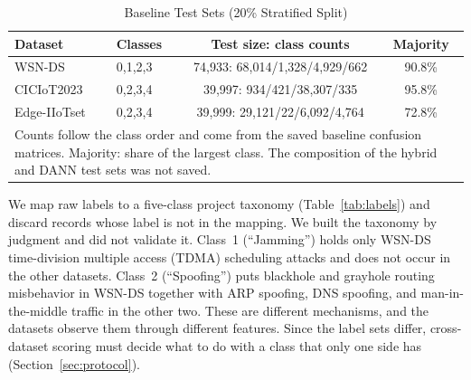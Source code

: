 \documentclass[conference]{IEEEtran}
\begin{document}
\begin{table}[t]
\caption{Baseline Test Sets (20\% Stratified Split)}
\label{tab:datasets}
\centering
\footnotesize
\setlength{\tabcolsep}{5pt}
\begin{tabular}{|l|l|c|c|}
\hline
\textbf{Dataset} & \textbf{Classes} & \textbf{Test size: class counts} & \textbf{Majority} \\
\hline
WSN-DS & 0,1,2,3 & 74{,}933: 68{,}014/1{,}328/4{,}929/662 & 90.8\% \\
\hline
CICIoT2023 & 0,2,3,4 & 39{,}997: 934/421/38{,}307/335 & 95.8\% \\
\hline
Edge-IIoTset & 0,2,3,4 & 39{,}999: 29{,}121/22/6{,}092/4{,}764 & 72.8\% \\
\hline
\multicolumn{4}{p{231pt}}{Counts follow the class order and come from the saved baseline confusion matrices. Majority: share of the largest class. The composition of the hybrid and DANN test sets was not saved.}
\end{tabular}
\end{table}

We map raw labels to a five-class project taxonomy (Table~\ref{tab:labels}) and discard records whose label is not in the mapping. We built the taxonomy by judgment and did not validate it. Class~1 (``Jamming'') holds only WSN-DS time-division multiple access (TDMA) scheduling attacks and does not occur in the other datasets. Class~2 (``Spoofing'') puts blackhole and grayhole routing misbehavior in WSN-DS together with ARP spoofing, DNS spoofing, and man-in-the-middle traffic in the other two. These are different mechanisms, and the datasets observe them through different features. Since the label sets differ, cross-dataset scoring must decide what to do with a class that only one side has (Section~\ref{sec:protocol}).
\end{document}
